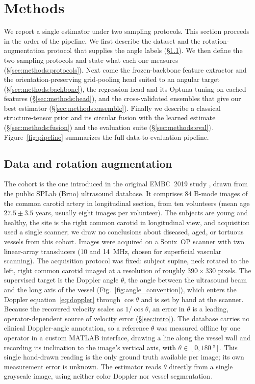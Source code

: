 \section{Methods}
\label{sec:methods}

We report a single estimator under two sampling protocols. This section proceeds in the order of the pipeline. We first describe the dataset and the rotation-augmentation protocol that supplies the angle labels (\S\ref{sec:methods:data}). We then define the two sampling protocols and state what each one measures (\S\ref{sec:methods:protocols}). Next come the frozen-backbone feature extractor and the orientation-preserving grid-pooling head suited to an angular target (\S\ref{sec:methods:backbone}), the regression head and its Optuna tuning on cached features (\S\ref{sec:methods:head}), and the cross-validated ensembles that give our best estimator (\S\ref{sec:methods:ensemble}). Finally we describe a classical structure-tensor prior and its circular fusion with the learned estimate (\S\ref{sec:methods:fusion}) and the evaluation suite (\S\ref{sec:methods:eval}). Figure~\ref{fig:pipeline} summarizes the full data-to-evaluation pipeline.



\subsection{Data and rotation augmentation}
\label{sec:methods:data}

The cohort is the one introduced in the original EMBC~2019 study \citep{Patil2019}, drawn from the public SPLab (Brno) ultrasound database. It comprises \num{84} B-mode images of the common carotid artery in longitudinal section, from ten volunteers (mean age $27.5\pm3.5$ years, usually eight images per volunteer). The subjects are young and healthy, the site is the right common carotid in longitudinal view, and acquisition used a single scanner; we draw no conclusions about diseased, aged, or tortuous vessels from this cohort. Images were acquired on a Sonix~OP scanner with two linear-array transducers (\num{10} and \SI{14}{\mega\hertz}, chosen for superficial vascular scanning). The acquisition protocol was fixed: subject supine, neck rotated to the left, right common carotid imaged at a resolution of roughly $390\times330$ pixels. The supervised target is the Doppler angle $\theta$, the angle between the ultrasound beam and the long axis of the vessel (Fig.~\ref{fig:angle_convention}), which enters the Doppler equation~\eqref{eq:doppler} through $\cos\theta$ and is set by hand at the scanner. Because the recovered velocity scales as $1/\cos\theta$, an error in $\theta$ is a leading, operator-dependent source of velocity error (\S\ref{sec:intro}). The database carries no clinical Doppler-angle annotation, so a reference $\theta$ was measured offline by one operator in a custom MATLAB interface, drawing a line along the vessel wall and recording its inclination to the image's vertical axis, with $\theta\in[0,\SI{180}{\degree}]$. This single hand-drawn reading is the only ground truth available per image; its own measurement error is unknown. The estimator reads $\theta$ directly from a single grayscale image, using neither color Doppler nor vessel segmentation.

